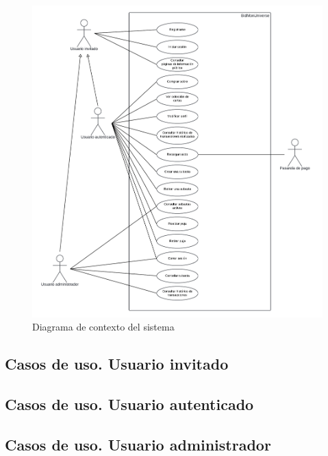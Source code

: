 \begin{figure}[H]
    \centering
    \includegraphics[width=1\textwidth]{figures/6-Analisis/6-Casos-uso/6_Diagrama-contexto.png}
    \caption{Diagrama de contexto del sistema}
    \label{fig:diagrama_contexto}
\end{figure}


\subsection{Casos de uso. Usuario invitado}


\newpage
\subsection{Casos de uso. Usuario autenticado}


\newpage
\subsection{Casos de uso. Usuario administrador}

